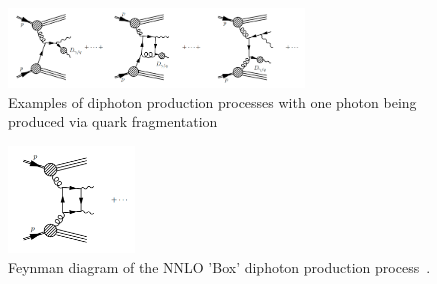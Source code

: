 \begin{figure}[hb]
  \centering
  \includegraphics[width = 0.7\textwidth]{figures/introduction/nlo.png}
  \caption{
    Examples of diphoton production processes with one photon being produced via quark fragmentation~\cite{61}
  }
  \label{fig:nlo_dipho}
\end{figure}

\begin{figure}[hb]
  \centering
  \includegraphics[width = 0.3\textwidth]{figures/introduction/box.png}
  \caption{
    Feynman diagram of the NNLO ’Box’ diphoton production process~\cite{61}.
  }
  \label{fig:lo_dipho}
\end{figure}
